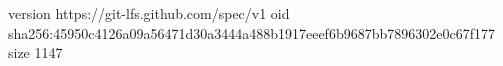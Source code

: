 version https://git-lfs.github.com/spec/v1
oid sha256:45950c4126a09a56471d30a3444a488b1917eeef6b9687bb7896302e0c67f177
size 1147
